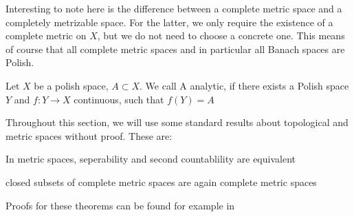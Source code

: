 \documentclass[10pt, a4paper, titlepage]{article}
\numberwithin{equation}{section}
\begin{document}
\begin{remark}
	
Interesting to note here is the difference between a complete metric space and a completely metrizable space.
For the latter, we only require the existence of a complete metric on $X$, but we do not need to choose a concrete one.
This means of course that all complete metric spaces and in particular all Banach spaces are Polish.\\
\end{remark}


\begin{definition}
	Let $X$ be a polish space, $A \subset X$. We call A analytic, if there exists a Polish space $Y$ and  $f:Y \to X$ continuous, such that  $f(Y) = A$

\end{definition}

Throughout this section, we will use some standard results about topological and metric spaces without proof. These are:
\begin{corollary}
	\label{second_countable}
	In metric spaces, seperability and second countablility are equivalent
\end{corollary}
\begin{corollary}
	\label{closed_cc}
	closed subsets of complete metric spaces are again complete metric spaces
\end{corollary}
Proofs for these theorems can be found for example in \cite{kaplansky2001}
\end{document}
